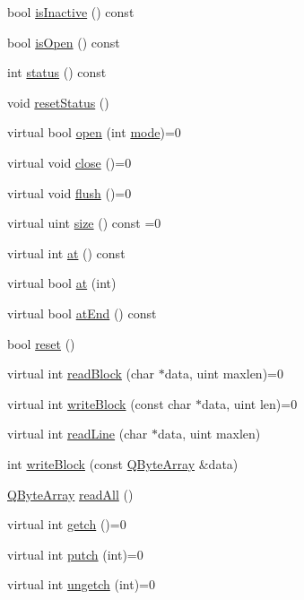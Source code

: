 \begin{DoxyCompactItemize}
\item 
bool \mbox{\hyperlink{class_q_i_o_device_ac959646567aba4ad6c4e1f280e10bbdd}{is\+Inactive}} () const
\item 
bool \mbox{\hyperlink{class_q_i_o_device_a291d97cdb38c1cd261bfbaa67a9d3923}{is\+Open}} () const
\item 
int \mbox{\hyperlink{class_q_i_o_device_aa9079e73ab2403922c528523cdf2d4ef}{status}} () const
\item 
void \mbox{\hyperlink{class_q_i_o_device_a1cd60113e530d3202d6dadf12021374c}{reset\+Status}} ()
\item 
virtual bool \mbox{\hyperlink{class_q_i_o_device_ae4046ae7bf4d4cee1010239973314e42}{open}} (int \mbox{\hyperlink{class_q_i_o_device_ad2a025933d4c1fc013f7c7f7ce2601ab}{mode}})=0
\item 
virtual void \mbox{\hyperlink{class_q_i_o_device_a01a9ddac5d964b5b6a1f10005bf28a4f}{close}} ()=0
\item 
virtual void \mbox{\hyperlink{class_q_i_o_device_a39eccb592ae076fbc42108a3d590fb43}{flush}} ()=0
\item 
virtual uint \mbox{\hyperlink{class_q_i_o_device_a60c4146763625213ac7aa29f1f071592}{size}} () const =0
\item 
virtual int \mbox{\hyperlink{class_q_i_o_device_a0dee1db4a9e506924ccac6982ffdf3df}{at}} () const
\item 
virtual bool \mbox{\hyperlink{class_q_i_o_device_a14643fc1c2e05c2addd1ecc03bd98017}{at}} (int)
\item 
virtual bool \mbox{\hyperlink{class_q_i_o_device_ac5a3fcc9349a98d8f260039c5fd58812}{at\+End}} () const
\item 
bool \mbox{\hyperlink{class_q_i_o_device_ac2f29866602352c08b3d3cb3f1fdc7e2}{reset}} ()
\item 
virtual int \mbox{\hyperlink{class_q_i_o_device_a71f10647e4bd98141f45362b9a06983a}{read\+Block}} (char $\ast$data, uint maxlen)=0
\item 
virtual int \mbox{\hyperlink{class_q_i_o_device_a5d937df1bde2f956872dd54e077807d1}{write\+Block}} (const char $\ast$data, uint len)=0
\item 
virtual int \mbox{\hyperlink{class_q_i_o_device_a4dc865ffcb5b7896ff8f9a1d828e4c0e}{read\+Line}} (char $\ast$data, uint maxlen)
\item 
int \mbox{\hyperlink{class_q_i_o_device_a17d3fa98dc9e5eab406a6fa728c4b656}{write\+Block}} (const \mbox{\hyperlink{class_q_array}{Q\+Byte\+Array}} \&data)
\item 
\mbox{\hyperlink{class_q_array}{Q\+Byte\+Array}} \mbox{\hyperlink{class_q_i_o_device_a2b93df374c6eea09c68a95cf99d66e6f}{read\+All}} ()
\item 
virtual int \mbox{\hyperlink{class_q_i_o_device_a7cef61d66023f9cda6b0912082bd19fc}{getch}} ()=0
\item 
virtual int \mbox{\hyperlink{class_q_i_o_device_a5de5c1c1cba7ca36ba93289e30cd3029}{putch}} (int)=0
\item 
virtual int \mbox{\hyperlink{class_q_i_o_device_aae3d67422103e8fc0411297b1d62c29a}{ungetch}} (int)=0
\end{DoxyCompactItemize}
